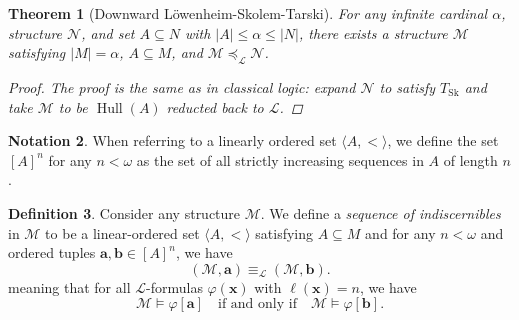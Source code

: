 \documentclass{amsart}
\newtheorem{theorem}{Theorem}[section]
\theoremstyle{definition}
\newtheorem{definition}[theorem]{Definition}
\newtheorem{notation}[theorem]{Notation}
\numberwithin{equation}{theorem}
\renewcommand{\phi}{\varphi}
\newcommand{\V}{\mathbf}
\newcommand{\len}{\ell}
\newcommand{\Tskolem}{{T_{\operatorname{Sk}}}}
\newcommand{\frag}{\mathcal{L}}
\newcommand{\hull}{\operatorname{Hull}}
\begin{document}
\begin{theorem}[Downward L\"owenheim-Skolem-Tarski]
  For any infinite cardinal $\alpha$, structure $\mathcal N$, and set $A\subseteq N$ with $|A|\leq\alpha\leq|N|$, there exists a structure $\mathcal M$ satisfying $|M|=\alpha$, $A\subseteq M$, and $\mathcal M\preceq_\frag\mathcal N$.
  
  \begin{proof}
    The proof is the same as in classical logic: expand $\mathcal N$ to satisfy $\Tskolem$ and take $\mathcal M$ to be $\hull(A)$ reducted back to $\frag$.
  \end{proof}
\end{theorem}

\begin{notation}
  When referring to a linearly ordered set $\langle A,<\rangle$, we define the set $[A]^n$ for any $n<\omega$ as the set of all strictly increasing sequences in $A$ of length $n$.
\end{notation}

\begin{definition}
  Consider any structure $\mathcal M$.
  We define a \emph{sequence of indiscernibles} in $\mathcal M$ to be a linear-ordered set $\langle A,<\rangle$ satisfying $A\subseteq M$ and for any $n<\omega$ and ordered tuples $\V a,\V b\in[A]^n$, we have
  \[
    (\mathcal M,\V a)\equiv_\frag (\mathcal M,\V b).
  \]
  meaning that for all $\frag$-formulas $\phi(\V x)$ with $\len(\V x)=n$, we have
  \[
    \mathcal M\models\phi[\V a]\quad\text{if and only if}\quad\mathcal M\models\phi[\V b].
  \]
\end{definition}
\end{document}
